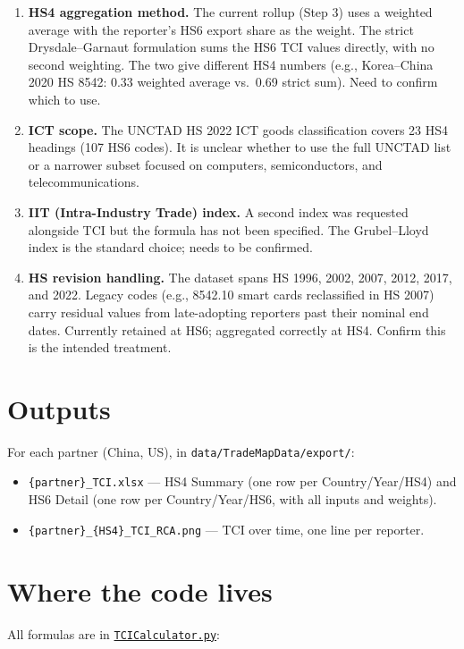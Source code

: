 \documentclass[11pt,a4paper]{article}
\begin{document}
\begin{enumerate}\setlength{\itemsep}{2pt}
  \item \textbf{HS4 aggregation method.} The current rollup (Step 3) uses a weighted average with the reporter's HS6 export share as the weight. The strict Drysdale--Garnaut formulation sums the HS6 TCI values directly, with no second weighting. The two give different HS4 numbers (e.g., Korea--China 2020 HS 8542: 0.33 weighted average vs.\ 0.69 strict sum). Need to confirm which to use.
  \item \textbf{ICT scope.} The UNCTAD HS 2022 ICT goods classification covers 23 HS4 headings (107 HS6 codes). It is unclear whether to use the full UNCTAD list or a narrower subset focused on computers, semiconductors, and telecommunications.
  \item \textbf{IIT (Intra-Industry Trade) index.} A second index was requested alongside TCI but the formula has not been specified. The Grubel--Lloyd index is the standard choice; needs to be confirmed.
  \item \textbf{HS revision handling.} The dataset spans HS 1996, 2002, 2007, 2012, 2017, and 2022. Legacy codes (e.g., 8542.10 smart cards reclassified in HS 2007) carry residual values from late-adopting reporters past their nominal end dates. Currently retained at HS6; aggregated correctly at HS4. Confirm this is the intended treatment.
\end{enumerate}

\section*{Outputs}
For each partner (China, US), in \texttt{data/TradeMapData/export/}:
\begin{itemize}\setlength{\itemsep}{0pt}
  \item \texttt{\{partner\}\_TCI.xlsx} --- HS4 Summary (one row per Country/Year/HS4) and HS6 Detail (one row per Country/Year/HS6, with all inputs and weights).
  \item \texttt{\{partner\}\_\{HS4\}\_TCI\_RCA.png} --- TCI over time, one line per reporter.
\end{itemize}

\section*{Where the code lives}
All formulas are in \href{../loadFiles/services/TCICalculator.py}{\texttt{TCICalculator.py}}:
\end{document}
